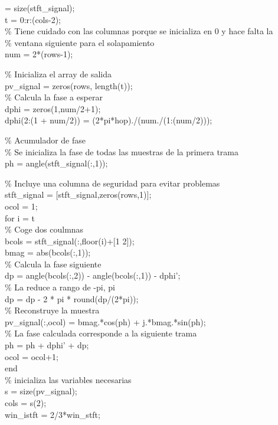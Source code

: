  = size(stft\_signal);\\
t = 0:r:(cols-2);\\
\% Tiene cuidado con las columnas porque se inicializa en 0 y hace falta la\\
\% ventana siguiente para el solapamiento\\

\noindent num = 2*(rows-1);

\noindent \% Inicializa el array de salida\\
pv\_signal = zeros(rows, length(t));\\

\noindent \% Calcula la fase a esperar\\
dphi = zeros(1,num/2+1);\\
dphi(2:(1 + num/2)) = (2*pi*hop)./(num./(1:(num/2)));

\noindent \% Acumulador de fase\\
\% Se inicializa la fase de todas las muestras de la primera trama\\
ph = angle(stft\_signal(:,1));

\noindent \% Incluye una columna de seguridad para evitar problemas\\
stft\_signal = [stft\_signal,zeros(rows,1)];\\
ocol = 1;\\
for i = t\\
  \% Coge dos coulmnas\\
  bcols = stft\_signal(:,floor(i)+[1 2]);\\
  bmag = abs(bcols(:,1));\\
  \% Calcula la fase siguiente\\
  dp = angle(bcols(:,2)) - angle(bcols(:,1)) - dphi';\\
  \% La reduce a rango de -pi, pi\\
  dp = dp - 2 * pi * round(dp/(2*pi));\\
  \% Reconstruye la muestra\\ 
  pv\_signal(:,ocol) = bmag.*cos(ph) + j.*bmag.*sin(ph);\\
  \% La fase calculada corresponde a la siguiente trama\\
  ph = ph + dphi' + dp;\\
  ocol = ocol+1;\\
end\\

\noindent \% inicializa las variables necesarias\\
s = size(pv\_signal);\\
cols = s(2);\\
win\_istft = 2/3*win\_stft;\\

